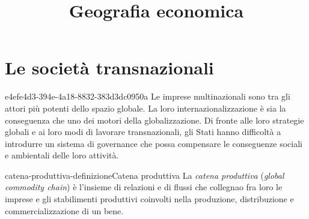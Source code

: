 \documentclass[preview]{standalone}
\begin{document}
\title{Geografia economica}
\genpage

\section{Le società transnazionali}

\begin{snippet}{e4efe4d3-394e-4a18-8832-383d3dc0950a}
    Le imprese multinazionali sono tra gli attori più potenti dello spazio globale. La loro
    internazionalizzazione è sia la conseguenza che uno dei motori della globalizzazione. Di fronte alle loro
    strategie globali e ai loro modi di lavorare transnazionali, gli Stati hanno difficoltà a introdurre un
    sistema di governance che possa compensare le conseguenze sociali e ambientali delle loro attività.
\end{snippet}


\begin{snippetdefinition}{catena-produttiva-definizione}{Catena produttiva}
    La \textit{catena produttiva} (\textit{global commodity chain}) è l'insieme di relazioni e di flussi che collegnao
    fra loro le imprese e gli stabilimenti produttivi coinvolti nella 
    produzione, distribuzione e commercializzazione di un bene.
\end{snippetdefinition}
\end{document}

